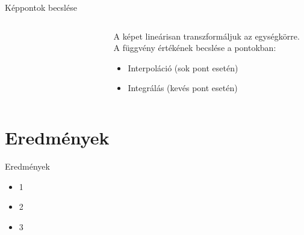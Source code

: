 \documentclass{beamer}
\begin{document}
\begin{frame}{Képpontok becslése}
\begin{columns}
\begin{column}{0.5\textwidth}
\begin{figure}
\begin{subfigure}{.48\textwidth}
            \end{subfigure}
            \begin{subfigure}{.48\textwidth}
                \centering
            \includegraphics[width=\textwidth]{figures/pepper_integral.png}
            \end{subfigure}
        \end{figure}
    \end{column}
    \begin{column}{0.5\textwidth}
        A képet lineárisan transzformáljuk az egységkörre.
        \vskip 3mm
        A függvény értékének becslése a pontokban:
        \begin{itemize}
            \item Interpoláció (sok pont esetén)
            \item Integrálás (kevés pont esetén)
        \end{itemize}
    \end{column}
\end{columns}

\end{frame}


\section{Eredmények}
\begin{frame}{Eredmények}
    \begin{itemize}
    \item 1
    \item 2
    \item 3
    \end{itemize}
\end{frame}
\end{document}
